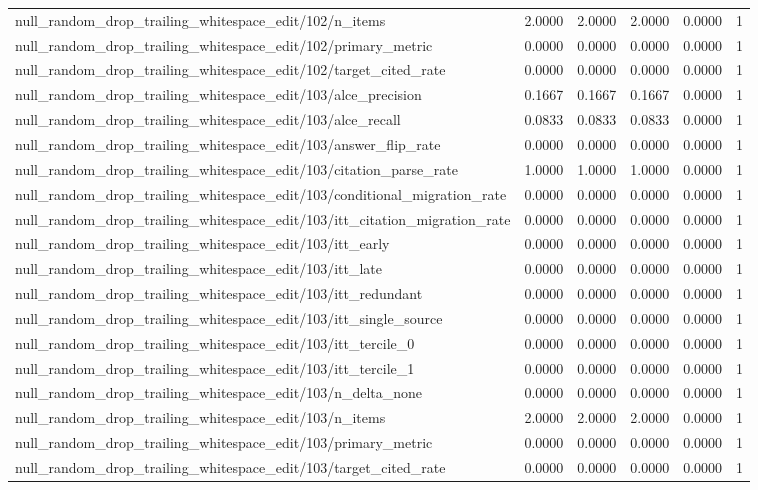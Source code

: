 \begin{table}[h]
\begin{tabular}{lrrrrr}
null_random_drop_trailing_whitespace_edit/102/n_items & 2.0000 & 2.0000 & 2.0000 & 0.0000 & 1 \\
null_random_drop_trailing_whitespace_edit/102/primary_metric & 0.0000 & 0.0000 & 0.0000 & 0.0000 & 1 \\
null_random_drop_trailing_whitespace_edit/102/target_cited_rate & 0.0000 & 0.0000 & 0.0000 & 0.0000 & 1 \\
null_random_drop_trailing_whitespace_edit/103/alce_precision & 0.1667 & 0.1667 & 0.1667 & 0.0000 & 1 \\
null_random_drop_trailing_whitespace_edit/103/alce_recall & 0.0833 & 0.0833 & 0.0833 & 0.0000 & 1 \\
null_random_drop_trailing_whitespace_edit/103/answer_flip_rate & 0.0000 & 0.0000 & 0.0000 & 0.0000 & 1 \\
null_random_drop_trailing_whitespace_edit/103/citation_parse_rate & 1.0000 & 1.0000 & 1.0000 & 0.0000 & 1 \\
null_random_drop_trailing_whitespace_edit/103/conditional_migration_rate & 0.0000 & 0.0000 & 0.0000 & 0.0000 & 1 \\
null_random_drop_trailing_whitespace_edit/103/itt_citation_migration_rate & 0.0000 & 0.0000 & 0.0000 & 0.0000 & 1 \\
null_random_drop_trailing_whitespace_edit/103/itt_early & 0.0000 & 0.0000 & 0.0000 & 0.0000 & 1 \\
null_random_drop_trailing_whitespace_edit/103/itt_late & 0.0000 & 0.0000 & 0.0000 & 0.0000 & 1 \\
null_random_drop_trailing_whitespace_edit/103/itt_redundant & 0.0000 & 0.0000 & 0.0000 & 0.0000 & 1 \\
null_random_drop_trailing_whitespace_edit/103/itt_single_source & 0.0000 & 0.0000 & 0.0000 & 0.0000 & 1 \\
null_random_drop_trailing_whitespace_edit/103/itt_tercile_0 & 0.0000 & 0.0000 & 0.0000 & 0.0000 & 1 \\
null_random_drop_trailing_whitespace_edit/103/itt_tercile_1 & 0.0000 & 0.0000 & 0.0000 & 0.0000 & 1 \\
null_random_drop_trailing_whitespace_edit/103/n_delta_none & 0.0000 & 0.0000 & 0.0000 & 0.0000 & 1 \\
null_random_drop_trailing_whitespace_edit/103/n_items & 2.0000 & 2.0000 & 2.0000 & 0.0000 & 1 \\
null_random_drop_trailing_whitespace_edit/103/primary_metric & 0.0000 & 0.0000 & 0.0000 & 0.0000 & 1 \\
null_random_drop_trailing_whitespace_edit/103/target_cited_rate & 0.0000 & 0.0000 & 0.0000 & 0.0000 & 1 \\

\end{tabular}
\end{table}
